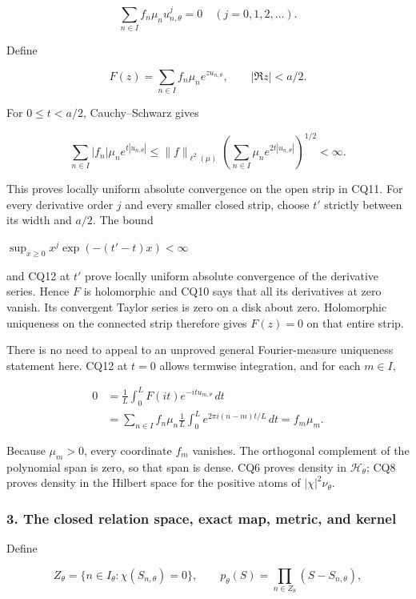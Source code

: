 \[
\sum_{n\in I}f_n\mu_nu_{n,\theta}^{j}=0
\quad(j=0,1,2,\ldots).
\tag{CQ10}
\]

Define

\[
F(z)=\sum_{n\in I}f_n\mu_ne^{zu_{n,\theta}},
\qquad |\Re z|<a/2.
\tag{CQ11}
\]

For \(0 \le t < a/2\), Cauchy--Schwarz gives

\[
\sum_{n\in I}|f_n|\mu_ne^{t|u_{n,\theta}|}
\le\|f\|_{\ell^2(\mu)}
\left(\sum_{n\in I}\mu_ne^{2t|u_{n,\theta}|}\right)^{1/2}<\infty.
\tag{CQ12}
\]

This proves locally uniform absolute convergence on the open strip in CQ11. For every derivative order \(j\) and every smaller closed strip, choose \(t'\) strictly between its width and \(a/2\). The bound

\(\sup_{x \ge 0} x^j \exp(-(t'-t)x) < \infty\)

and CQ12 at \(t'\) prove locally uniform absolute convergence of the derivative series. Hence \(F\) is holomorphic and CQ10 says that all its derivatives at zero vanish. Its convergent Taylor series is zero on a disk about zero. Holomorphic uniqueness on the connected strip therefore gives \(F(z)=0\) on that entire strip.

There is no need to appeal to an unproved general Fourier-measure uniqueness statement here. CQ12 at \(t=0\) allows termwise integration, and for each \(m \in I\),

\[
\begin{aligned}
0&=\frac1L\int_0^L F(it)e^{-it u_{m,\theta}}\,dt\\
&=\sum_{n\in I}f_n\mu_n
\frac1L\int_0^L e^{2\pi i(n-m)t/L}\,dt
=f_m\mu_m.
\end{aligned}
\tag{CQ13}
\]

Because \(\mu_m>0\), every coordinate \(f_m\) vanishes. The orthogonal complement of the polynomial span is zero, so that span is dense. CQ6 proves density in \(\mathcal H_\theta\); CQ8 proves density in the Hilbert space for the positive atoms of \(|\chi|^2 \nu_\theta\).

\subsubsection{3. The closed relation space, exact map, metric, and kernel}\label{the-closed-relation-space-exact-map-metric-and-kernel}

Define

\[
Z_\theta=\{n\in I_\theta:\chi(S_{n,\theta})=0\},\qquad
p_\theta(S)=\prod_{n\in Z_\theta}(S-S_{n,\theta}),
\tag{CQ14}
\]


